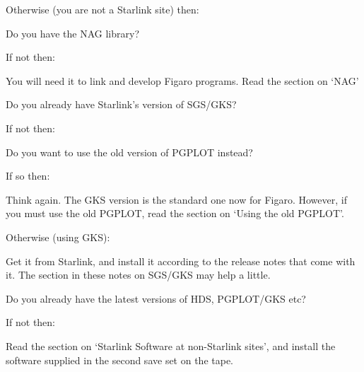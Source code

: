 Otherwise (you are not a Starlink site) then:
\begin{description}
	\item Do you have the NAG library?
	\begin{description}
		\item If not then:
		\begin{description}
			\item You will need it to link and develop Figaro
programs. Read the section on `NAG'
		\end{description}
	\end{description}
	\item Do you already have Starlink's version of SGS/GKS?
	\begin{description}
		\item If not then:
		\begin{description}
			\item Do you want to use the old version of PGPLOT
instead?
			\begin{description}
				\item If so then:
				\begin{description}
					\item Think again. The GKS version is
the standard one now for Figaro. However, if you must use the old PGPLOT, read
the section on `Using the old PGPLOT'.
				\end{description}
				\item Otherwise (using GKS):
                         	\begin{description}
					\item Get it from Starlink, and
install it according to the release notes that come with it. The section in
these notes on SGS/GKS may help a little.
				\end{description}
			\end{description}
		\end{description}
	\end{description}
	\item Do you already have the latest versions of HDS, PGPLOT/GKS etc?
	\begin{description}
		\item If not then:
		\begin{description}
			\item Read the section on `Starlink Software at
non-Starlink sites', and install the software supplied in the second save set
on the tape.
		\end{description}
	\end{description}
\end{description}

